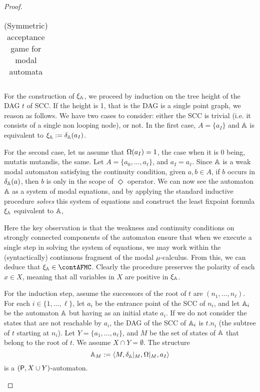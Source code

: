 \begin{proof}
\begin{pfclaim}
\begin{table}[h]
\begin{tabular}{|l|c|l|c|}
  \hline
\end{tabular}
 \caption{(Symmetric) acceptance game for modal automata}
 \label{symmetric_modal_game}
\end{table}





For the construction of $\xi_\mathbb{A}$, we proceed by induction on the tree height of the DAG $t$ of SCC. If the height is 1, that is the DAG is a single point graph, we reason as follows.
 We have two cases to consider: either the SCC is trivial (i.e. it consists of a single non looping node), or not.
In the first case, $A=\{a_I\}$ and $\mathbb{A}$ is equivalent to $\xi_\mathbb{A}:=\delta_\mathbb{A}(a_I)$.

For the second case, let us assume that $\Omega(a_I)=1$, the case when it is $0$ being, mutatis mutandis, the same.
Let $A=\{a_0, \dots, a_\ell\}$, and $a_I=a_\ell$.
Since $\mathbb{A}$ is a weak modal automaton satisfying the continuity condition, given $a,b \in A$, if $b$ occurs in $\delta_\mathbb{A}(a)$, then $b$ is only in the scope of $\Diamond$ operator. 
We can now see the automaton $\mathbb{A}$
as a system of modal equations, and by applying the standard inductive procedure \emph{solves} this system of equations and
construct the least fixpoint formula $\xi_\mathbb{A}$ equivalent to $\mathbb{A}$, 

%
Here the key observation is that the weakness and continuity conditions on
strongly connected components of the automaton ensure that when we execute
a single step in solving the system of equations, we 
may work within the 
(syntactically) continuous fragment of the modal $\mu$-calculus.
From this, we can deduce that $\xi_\aut \in \contAFMC$. Clearly the procedure preserves the polarity of each $x \in X$, meaning that all variables in $X$ are positive in $\xi_\mathbb{A}$.


For the induction step, assume the successors of the root of $t$ are $(n_1, \dots, n_\ell)$. For each $i \in \{1,\dots,\ell\}$, let $a_i$ be the entrance point of the SCC of $n_i$, and let $\mathbb{A}_{i}$ be the automaton $\mathbb{A}$ but having as an initial state $a_i$. If we do not consider the states that are not reachable by $a_i$, the DAG of the SCC of $\mathbb{A}_{i}$ is $t.{n_i}$ (the subtree of $t$ starting at $n_i$).
Let $Y=\{a_1, \dots, a_\ell\}$, and $M$ be the set of states of $\mathbb{A}$ that belong to the root of $t$. We assume $X \cap Y = \emptyset$. The structure
\[
\aut_M := \tup{M, \delta_\aut|_{M}, \pmap|_{M}, a_I}
\] is a $(\mathsf{P}, X \cup Y)$-automaton.


\end{pfclaim}
\end{proof}
